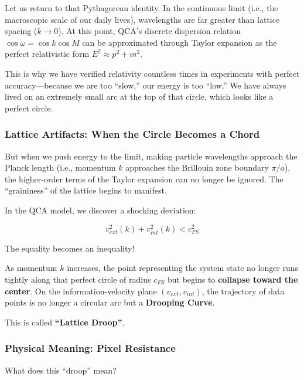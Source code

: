 Let us return to that Pythagorean identity. In the continuous limit (i.e., the macroscopic scale of our daily lives), wavelengths are far greater than lattice spacing ($k \to 0$). At this point, QCA's discrete dispersion relation $\cos \omega = \cos k \cos M$ can be approximated through Taylor expansion as the perfect relativistic form $E^2 \approx p^2 + m^2$.

This is why we have verified relativity countless times in experiments with perfect accuracy---because we are too ``slow,'' our energy is too ``low.'' We have always lived on an extremely small arc at the top of that circle, which looks like a perfect circle.

\subsubsection{Lattice Artifacts: When the Circle Becomes a Chord}

But when we push energy to the limit, making particle wavelengths approach the Planck length (i.e., momentum $k$ approaches the Brillouin zone boundary $\pi/a$), the higher-order terms of the Taylor expansion can no longer be ignored. The ``graininess'' of the lattice begins to manifest.

In the QCA model, we discover a shocking deviation:

\[v_{ext}^2(k) + v_{int}^2(k) < c_{FS}^2\]

The equality becomes an inequality!

As momentum $k$ increases, the point representing the system state no longer runs tightly along that perfect circle of radius $c_{FS}$ but begins to \textbf{collapse toward the center}. On the information-velocity plane $(v_{ext}, v_{int})$, the trajectory of data points is no longer a circular arc but a \textbf{Drooping Curve}.

This is called \textbf{``Lattice Droop''}.

\subsubsection{Physical Meaning: Pixel Resistance}

What does this ``droop'' mean?

